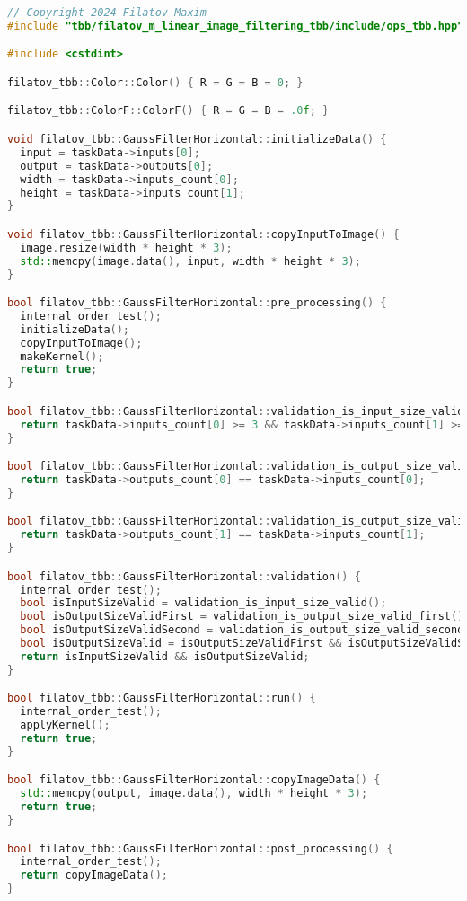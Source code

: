 \documentclass{report}
\begin{document}
\begin{lstlisting}[language=C++,caption=TBB версия]
// Copyright 2024 Filatov Maxim
#include "tbb/filatov_m_linear_image_filtering_tbb/include/ops_tbb.hpp"

#include <cstdint>

filatov_tbb::Color::Color() { R = G = B = 0; }

filatov_tbb::ColorF::ColorF() { R = G = B = .0f; }

void filatov_tbb::GaussFilterHorizontal::initializeData() {
  input = taskData->inputs[0];
  output = taskData->outputs[0];
  width = taskData->inputs_count[0];
  height = taskData->inputs_count[1];
}

void filatov_tbb::GaussFilterHorizontal::copyInputToImage() {
  image.resize(width * height * 3);
  std::memcpy(image.data(), input, width * height * 3);
}

bool filatov_tbb::GaussFilterHorizontal::pre_processing() {
  internal_order_test();
  initializeData();
  copyInputToImage();
  makeKernel();
  return true;
}

bool filatov_tbb::GaussFilterHorizontal::validation_is_input_size_valid() {
  return taskData->inputs_count[0] >= 3 && taskData->inputs_count[1] >= 3;
}

bool filatov_tbb::GaussFilterHorizontal::validation_is_output_size_valid_first() {
  return taskData->outputs_count[0] == taskData->inputs_count[0];
}

bool filatov_tbb::GaussFilterHorizontal::validation_is_output_size_valid_second() {
  return taskData->outputs_count[1] == taskData->inputs_count[1];
}

bool filatov_tbb::GaussFilterHorizontal::validation() {
  internal_order_test();
  bool isInputSizeValid = validation_is_input_size_valid();
  bool isOutputSizeValidFirst = validation_is_output_size_valid_first();
  bool isOutputSizeValidSecond = validation_is_output_size_valid_second();
  bool isOutputSizeValid = isOutputSizeValidFirst && isOutputSizeValidSecond;
  return isInputSizeValid && isOutputSizeValid;
}

bool filatov_tbb::GaussFilterHorizontal::run() {
  internal_order_test();
  applyKernel();
  return true;
}

bool filatov_tbb::GaussFilterHorizontal::copyImageData() {
  std::memcpy(output, image.data(), width * height * 3);
  return true;
}

bool filatov_tbb::GaussFilterHorizontal::post_processing() {
  internal_order_test();
  return copyImageData();
}


\end{lstlisting}
\end{document}
